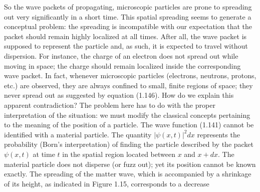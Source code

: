 \documentclass[10pt]{article}
\begin{document}
So the wave packets of propagating, microscopic particles are prone to spreading out very significantly in a short time. This spatial spreading seems to generate a conceptual problem: the spreading is incompatible with our expectation that the packet should remain highly localized at all times. After all, the wave packet is supposed to represent the particle and, as such, it is expected to travel without dispersion. For instance, the charge of an electron does not spread out while moving in space; the charge should remain localized inside the corresponding wave packet. In fact, whenever microscopic particles (electrons, neutrons, protons, etc.) are observed, they are always confined to small, finite regions of space; they never spread out as suggested by equation (1.146). How do we explain this apparent contradiction? The problem here has to do with the proper interpretation of the situation: we must modify the classical concepts pertaining to the meaning of the position of a particle. The wave function (1.141) cannot be identified with a material particle. The quantity $|\psi(x, t)|^{2} d x$ represents the probability (Born's interpretation) of finding the particle described by the packet $\psi(x, t)$ at time $t$ in the spatial region located between $x$ and $x+d x$. The material particle does not disperse (or fuzz out); yet its position cannot be known exactly. The spreading of the matter wave, which is accompanied by a shrinkage of its height, as indicated in Figure 1.15, corresponds to a decrease
\end{document}
